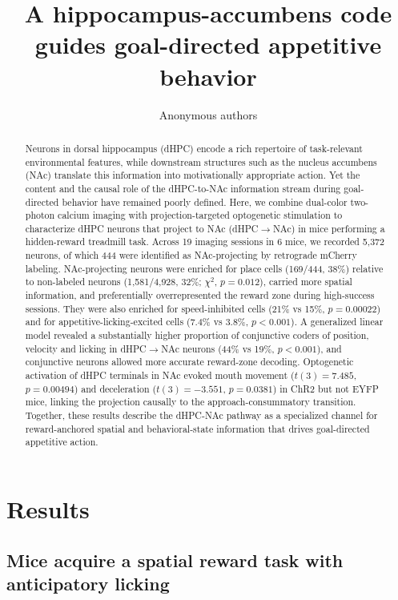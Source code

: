 \documentclass[11pt]{article}
\title{A hippocampus-accumbens code guides goal-directed appetitive behavior}
\author{Anonymous authors}
\affil{Target venue: Nature Neuroscience}
\date{}
\begin{document}
\maketitle

\begin{abstract}
Neurons in dorsal hippocampus (dHPC) encode a rich repertoire of task-relevant environmental features, while downstream structures such as the nucleus accumbens (NAc) translate this information into motivationally appropriate action. Yet the content and the causal role of the dHPC-to-NAc information stream during goal-directed behavior have remained poorly defined. Here, we combine dual-color two-photon calcium imaging with projection-targeted optogenetic stimulation to characterize dHPC neurons that project to NAc (dHPC$\rightarrow$NAc) in mice performing a hidden-reward treadmill task. Across 19 imaging sessions in 6 mice, we recorded 5{,}372 neurons, of which 444 were identified as NAc-projecting by retrograde mCherry labeling. NAc-projecting neurons were enriched for place cells (169/444, 38\%) relative to non-labeled neurons (1{,}581/4{,}928, 32\%; $\chi^2$, $p=0.012$), carried more spatial information, and preferentially overrepresented the reward zone during high-success sessions. They were also enriched for speed-inhibited cells (21\% vs 15\%, $p=0.00022$) and for appetitive-licking-excited cells (7.4\% vs 3.8\%, $p<0.001$). A generalized linear model revealed a substantially higher proportion of conjunctive coders of position, velocity and licking in dHPC$\rightarrow$NAc neurons (44\% vs 19\%, $p<0.001$), and conjunctive neurons allowed more accurate reward-zone decoding. Optogenetic activation of dHPC terminals in NAc evoked mouth movement ($t(3)=7.485$, $p=0.00494$) and deceleration ($t(3)=-3.551$, $p=0.0381$) in ChR2 but not EYFP mice, linking the projection causally to the approach-consummatory transition. Together, these results describe the dHPC-NAc pathway as a specialized channel for reward-anchored spatial and behavioral-state information that drives goal-directed appetitive action.
\end{abstract}



\section{Results}

\subsection{Mice acquire a spatial reward task with anticipatory licking}
\end{document}
